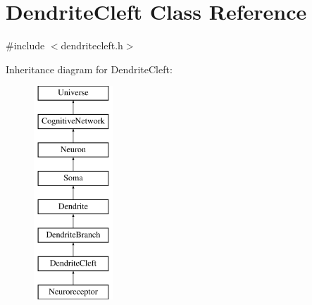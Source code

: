 \hypertarget{classDendriteCleft}{}\section{Dendrite\+Cleft Class Reference}
\label{classDendriteCleft}


{\ttfamily \#include $<$dendritecleft.\+h$>$}

Inheritance diagram for Dendrite\+Cleft\+:\begin{figure}[H]
\begin{center}
\leavevmode
\includegraphics[height=8.000000cm]{classDendriteCleft}
\end{center}
\end{figure}
